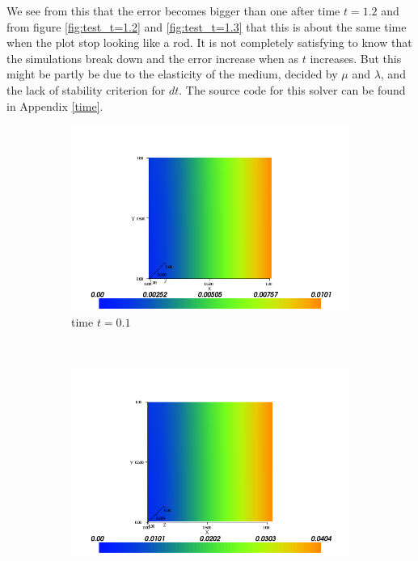 \documentclass[twoside]{article}
\begin{document}
We see from this that the error becomes bigger than one after time \( t = 1.2\) and from figure \ref{fig:test_t=1.2} and \ref{fig:test_t=1.3} that this is about the same time when the plot stop looking like a rod. It is not completely satisfying to know that the simulations break down and the error increase when as \( t\) increases. But this might be partly be due to the elasticity of the medium, decided by \( \mu \) and \( \lambda\), and the lack of stability criterion for \( dt\). The source code for this solver can be found in Appendix \ref{time}.
\begin{figure}
        \centering
        \begin{subfigure}[h]{0.31\textwidth}
                \centering
                \includegraphics[width=\textwidth]{test_t=01}
                \caption{time \( t = 0.1\)}
                \label{fig:test_t=0.1}
        \end{subfigure}%
        ~ %
        \begin{subfigure}[h]{0.31\textwidth}
                \centering
                \includegraphics[width=\textwidth]{test_t=02}

\end{subfigure}
\end{figure}
\end{document}
